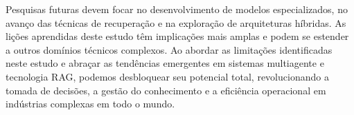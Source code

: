     Pesquisas futuras devem focar no desenvolvimento de modelos especializados, no avanço das técnicas de recuperação e na exploração de arquiteturas híbridas. As lições aprendidas deste estudo têm implicações mais amplas e podem se estender a outros domínios técnicos complexos. Ao abordar as limitações identificadas neste estudo e abraçar as tendências emergentes em sistemas multiagente e tecnologia RAG, podemos desbloquear seu potencial total, revolucionando a tomada de decisões, a gestão do conhecimento e a eficiência operacional em indústrias complexas em todo o mundo.
    
    